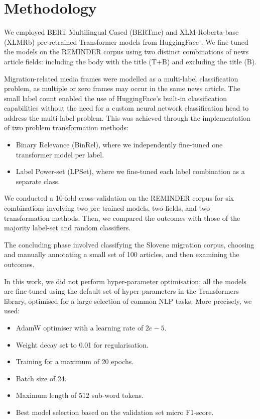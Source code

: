 \documentclass[10pt, a4paper]{article}
\begin{document}
\section{Methodology}
\label{sec:methodology}
We employed BERT Multilingual Cased \citep{devlin2018} (BERTmc) and XLM-Roberta-base \citep{conneau2019} (XLMRb) pre-retrained Transformer models from HuggingFace \cite{wolf-etal-2020-transformers}. We fine-tuned the models on the REMINDER corpus using two distinct combinations of news article fields: including the body with the title (T+B) and excluding the title (B).

Migration-related media frames were modelled as a multi-label classification problem, as multiple or zero frames may occur in the same news article.
The small label count enabled the use of HuggingFace's built-in classification capabilities without the need for a custom neural network classification head to address the multi-label problem.
This was achieved through the implementation of two problem transformation methods:
\begin{itemize}
  \item Binary Relevance (BinRel), where we independently fine-tuned one transformer model per label.
  \item Label Power-set (LPSet), where we fine-tuned each label combination as a separate class.
\end{itemize}

We conducted a 10-fold cross-validation on the REMINDER corpus for six combinations involving two pre-trained models, two fields, and two transformation methods. Then, we compared the outcomes with those of the majority label-set and random classifiers.

The concluding phase involved classifying the Slovene migration corpus, choosing and manually annotating a small set of 100 articles, and then examining the outcomes. 

In this work, we did not perform hyper-parameter optimisation; all the models are fine-tuned using the default set of hyper-parameters in the Transformers library, optimised for a large selection of common NLP tasks.
More precisely, we used:
\begin{itemize}\itemsep=0pt
  \item AdamW optimiser with a learning rate of $2e-5$.
  \item Weight decay set to 0.01 for regularisation.
  \item Training for a maximum of 20 epochs.
  \item Batch size of 24.
  \item Maximum length of 512 sub-word tokens.
  \item Best model selection based on the validation set micro F1-score.
\end{itemize}
\end{document}
